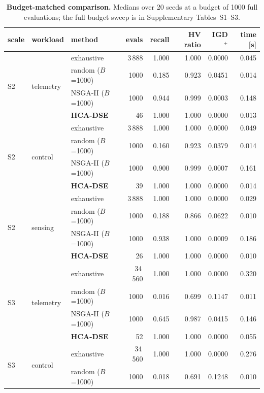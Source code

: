 \documentclass[pdflatex,sn-nature,lineno]{sn-jnl}
\begin{document}
\begin{table}[!htbp]
\centering
\caption{\textbf{Budget-matched comparison.} Medians over 20 seeds at a budget of 1000
full evaluations; the full budget sweep is in Supplementary Tables~S1--S3.}
\label{tab:ce:base}
{\setlength{\tabcolsep}{3pt}\scriptsize
\begin{tabular}{lllrrrrr}
\toprule
scale & workload & method & evals & recall & HV ratio & IGD$^{+}$ & time [s] \\
\midrule

\multirow{4}{*}{S2} & \multirow{4}{*}{telemetry} & exhaustive & 3\,888 & 1.000 & 1.000 & 0.0000 & 0.045 \\
 & & random ($B$=1000) & 1000 & 0.185 & 0.923 & 0.0451 & 0.014 \\
 & & NSGA-II ($B$=1000) & 1000 & 0.944 & 0.999 & 0.0003 & 0.148 \\
 & & \textbf{HCA-DSE} & 46 & 1.000 & 1.000 & 0.0000 & 0.013 \\
\midrule
\multirow{4}{*}{S2} & \multirow{4}{*}{control} & exhaustive & 3\,888 & 1.000 & 1.000 & 0.0000 & 0.049 \\
 & & random ($B$=1000) & 1000 & 0.160 & 0.923 & 0.0379 & 0.014 \\
 & & NSGA-II ($B$=1000) & 1000 & 0.900 & 0.999 & 0.0007 & 0.161 \\
 & & \textbf{HCA-DSE} & 39 & 1.000 & 1.000 & 0.0000 & 0.014 \\
\midrule
\multirow{4}{*}{S2} & \multirow{4}{*}{sensing} & exhaustive & 3\,888 & 1.000 & 1.000 & 0.0000 & 0.029 \\
 & & random ($B$=1000) & 1000 & 0.188 & 0.866 & 0.0622 & 0.010 \\
 & & NSGA-II ($B$=1000) & 1000 & 0.938 & 1.000 & 0.0009 & 0.186 \\
 & & \textbf{HCA-DSE} & 26 & 1.000 & 1.000 & 0.0000 & 0.010 \\
\midrule
\multirow{4}{*}{S3} & \multirow{4}{*}{telemetry} & exhaustive & 34\,560 & 1.000 & 1.000 & 0.0000 & 0.320 \\
 & & random ($B$=1000) & 1000 & 0.016 & 0.699 & 0.1147 & 0.011 \\
 & & NSGA-II ($B$=1000) & 1000 & 0.645 & 0.987 & 0.0415 & 0.146 \\
 & & \textbf{HCA-DSE} & 52 & 1.000 & 1.000 & 0.0000 & 0.055 \\
\midrule
\multirow{4}{*}{S3} & \multirow{4}{*}{control} & exhaustive & 34\,560 & 1.000 & 1.000 & 0.0000 & 0.276 \\
 & & random ($B$=1000) & 1000 & 0.018 & 0.691 & 0.1248 & 0.010 \\

\end{tabular}}
\end{table}
\end{document}
